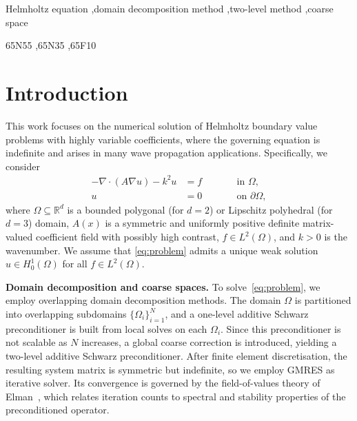 \documentclass[preprint,3p,times]{elsarticle}
\theoremstyle{definition}
\numberwithin{equation}{section}
\begin{document}
\begin{frontmatter}
\begin{keyword}
	Helmholtz equation \sep domain decomposition method \sep two-level method \sep coarse space 

	\MSC 65N55 \sep 65N35 \sep 65F10
\end{keyword}

\end{frontmatter}


\section{Introduction}
\label{CH:Intro}
This work focuses on the numerical solution of Helmholtz boundary value problems with highly variable coefficients, where the governing equation is indefinite and arises in many wave propagation applications. Specifically, we consider
\begin{equation}
\label{eq:problem}
	\begin{alignedat}{2}
		-\nabla \cdot (A \nabla u) - k^2 u &= f \qquad && \text{in } \Omega, \\
		u &= 0 \qquad && \text{on } \partial\Omega,
	\end{alignedat}
\end{equation}
where $\Omega \subseteq \mathbb{R}^d$ is a bounded polygonal (for $d=2$) or Lipschitz polyhedral (for $d=3$) domain, $A(x)$ is a symmetric and uniformly positive definite matrix-valued coefficient field with possibly high contrast, $f \in L^2(\Omega)$, and $k>0$ is the wavenumber. We assume that \eqref{eq:problem} admits a unique weak solution $u \in H^1_0(\Omega)$ for all $f \in L^2(\Omega)$.

\medskip
\noindent
\textbf{Domain decomposition and coarse spaces.} To solve~\eqref{eq:problem}, we employ overlapping domain decomposition methods. The domain $\Omega$ is partitioned into overlapping subdomains $\{\Omega_i\}_{i=1}^N$, and a one-level additive Schwarz preconditioner is built from local solves on each $\Omega_i$. Since this preconditioner is not scalable as $N$ increases, a global coarse correction is introduced, yielding a two-level additive Schwarz preconditioner. After finite element discretisation, the resulting system matrix is symmetric but indefinite, so we employ GMRES as iterative solver. Its convergence is governed by the field-of-values theory of Elman~\cite{Elman:1983:VIM}, which relates iteration counts to spectral and stability properties of the preconditioned operator. 
\end{document}
